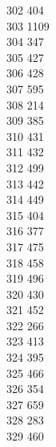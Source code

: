 { 302	404 \\
 303	1109 \\
 304	347 \\
 305	427 \\
 306	428 \\
 307	595 \\
 308	214 \\
 309	385 \\
 310	431 \\
 311	432 \\
 312	499 \\
 313	442 \\
 314	449 \\
 315	404 \\
 316	377 \\
 317	475 \\
 318	458 \\
 319	496 \\
 320	430 \\
 321	452 \\
 322	266 \\
 323	413 \\
 324	395 \\
 325	466 \\
 326	354 \\
 327	659 \\
 328	283 \\
 329	460 \\
}
